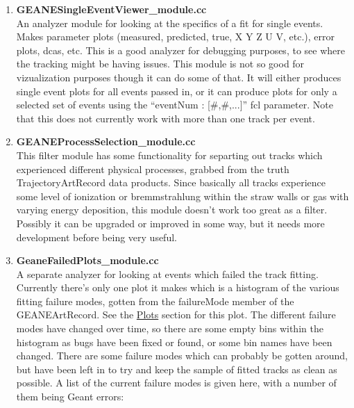\begin{enumerate}
      \item{\bf{GEANESingleEventViewer\_module.cc}} \\
      An analyzer module for looking at the specifics of a fit for single events. Makes parameter plots (measured, predicted, true, X Y Z U V, etc.), error plots, dcas, etc. This is a good analyzer for debugging purposes, to see where the tracking might be having issues. This module is not so good for vizualization purposes though it can do some of that. It will either produces single event plots for all events passed in, or it can produce plots for only a selected set of events using the ``eventNum : [\#,\#,...]'' fcl parameter. Note that this does not currently work with more than one track per event.

      \item{\bf{GEANEProcessSelection\_module.cc}} \\
      This filter module has some functionality for separting out tracks which experienced different physical processes, grabbed from the truth TrajectoryArtRecord data products. Since basically all tracks experience some level of ionization or bremmstrahlung within the straw walls or gas with varying energy deposition, this module doesn't work too great as a filter. Possibly it can be upgraded or improved in some way, but it needs more development before being very useful.

      \item{\bf{GeaneFailedPlots\_module.cc}} \\
      A separate analyzer for looking at events which failed the track fitting. Currently there's only one plot it makes which is a histogram of the various fitting failure modes, gotten from the failureMode member of the GEANEArtRecord. See the \hyperref[sec:Plots]{Plots} section for this plot. The different failure modes have changed over time, so there are some empty bins within the histogram as bugs have been fixed or found, or some bin names have been changed. There are some failure modes which can probably be gotten around, but have been left in to try and keep the sample of fitted tracks as clean as possible. A list of the current failure modes is given here, with a number of them being Geant errors:

        \begin{itemize}


\end{itemize}
\end{enumerate}
